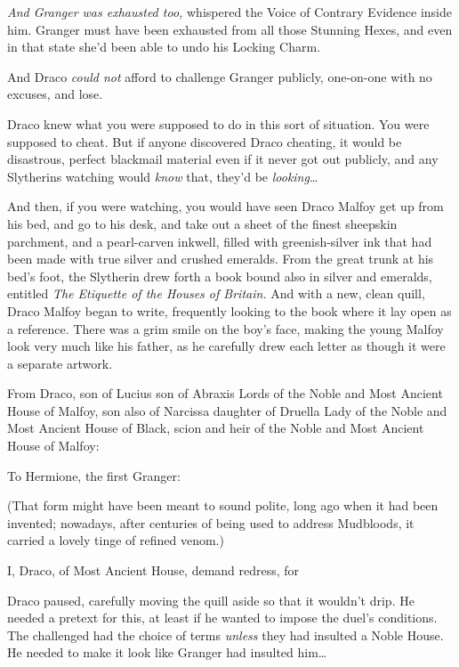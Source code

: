 \emph{And Granger was exhausted too,} whispered the Voice of Contrary Evidence inside him. Granger must have been exhausted from all those Stunning Hexes, and even in that state she'd been able to undo his Locking Charm.

And Draco \emph{could not} afford to challenge Granger publicly, one-on-one with no excuses, and lose.

Draco knew what you were supposed to do in this sort of situation. You were supposed to cheat. But if anyone discovered Draco cheating, it would be disastrous, perfect blackmail material even if it never got out publicly, and any Slytherins watching would \emph{know} that, they'd be \emph{looking}{\ldots}

And then, if you were watching, you would have seen Draco Malfoy get up from his bed, and go to his desk, and take out a sheet of the finest sheepskin parchment, and a pearl-carven inkwell, filled with greenish-silver ink that had been made with true silver and crushed emeralds. From the great trunk at his bed's foot, the Slytherin drew forth a book bound also in silver and emeralds, entitled \emph{The Etiquette of the Houses of Britain.} And with a new, clean quill, Draco Malfoy began to write, frequently looking to the book where it lay open as a reference. There was a grim smile on the boy's face, making the young Malfoy look very much like his father, as he carefully drew each letter as though it were a separate artwork.

\begin{writtenNote}
From Draco, son of Lucius son of Abraxis Lords of the Noble and Most Ancient House of Malfoy, son also of Narcissa daughter of Druella Lady of the Noble and Most Ancient House of Black, scion and heir of the Noble and Most Ancient House of Malfoy:

To Hermione, the first Granger:
\end{writtenNote}

(That form might have been meant to sound polite, long ago when it had been invented; nowadays, after centuries of being used to address Mudbloods, it carried a lovely tinge of refined venom.)

\begin{writtenNote}
I, Draco, of Most Ancient House, demand redress, for
\end{writtenNote}

Draco paused, carefully moving the quill aside so that it wouldn't drip. He needed a pretext for this, at least if he wanted to impose the duel's conditions. The challenged had the choice of terms \emph{unless} they had insulted a Noble House. He needed to make it look like Granger had insulted him{\ldots}

